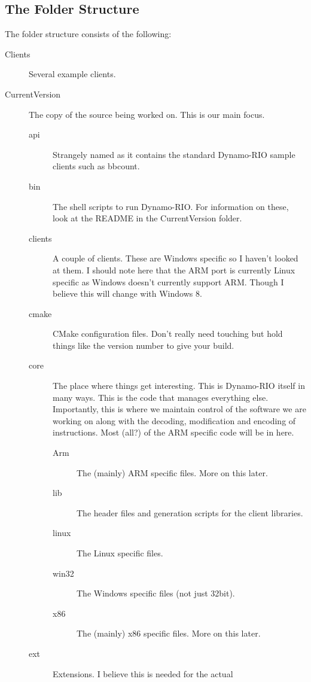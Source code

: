 \documentclass[a4paper]{article}
\begin{document}
\subsection{The Folder Structure}
The folder structure consists of the following:
\begin{description}
\item[Clients] Several example clients.
\item[CurrentVersion] The copy of the source being worked on. This is 
our main
focus.
        \begin{description}
        \item[api] Strangely named as it contains the standard 
Dynamo-RIO sample clients
        such as bbcount.
        \item[bin] The shell scripts to run Dynamo-RIO. For information 
on these, look
        at the README in the CurrentVersion folder.
        \item[clients] A couple of clients. These are Windows specific 
so I haven't
        looked at them. I should note here that the ARM port is 
currently Linux specific
        as Windows doesn't currently support ARM. Though I believe this 
will change with
        Windows 8.
        \item[cmake] CMake configuration files. Don't really need 
touching but hold
        things like the version number to give your build.
        \item[core] The place where things get interesting. This is 
Dynamo-RIO itself in
        many ways. This is the code that manages everything else. 
Importantly, this is
        where we maintain control of the software we are working on 
along with the
        decoding, modification and encoding of instructions. Most (all?) 
of the ARM
        specific code will be in here.
        \begin{description}
                \item[Arm] The (mainly) ARM specific files. More on this 
later.
                \item[lib] The header files and generation scripts for 
the client libraries.
                \item[linux] The Linux specific files.
                \item[win32] The Windows specific files (not just 
32bit).
                \item[x86] The (mainly) x86 specific files. More on this 
later.
        \end{description}
        \item[ext] Extensions. I believe this is needed for the actual 

\end{description}
\end{description}
\end{document}
